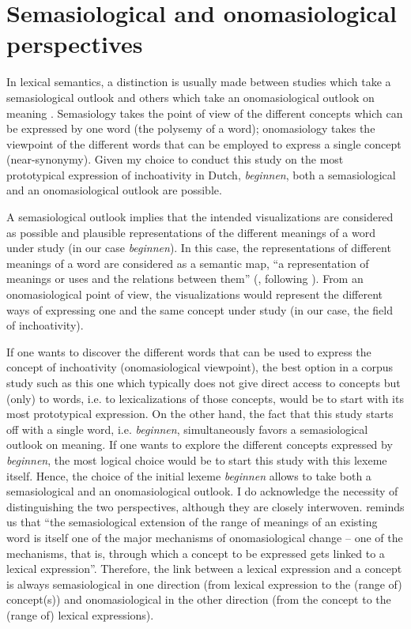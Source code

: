 \section{Semasiological and onomasiological perspectives}\largerpage
\label{sec:3.2}  
In lexical semantics, a distinction is usually made between studies which take a semasiological outlook and others which take an onomasiological outlook on meaning \citep{geeraerts_structure_1994}. Semasiology takes the point of view of the different concepts which can be expressed by one word (the polysemy of a word); onomasiology takes the viewpoint of the different words that can be employed to express a single concept (near-synonymy). Given my choice to conduct this study on the most prototypical expression of inchoativity in Dutch, \textit{beginnen}, both a semasiological and an onomasiological outlook are possible.

A semasiological outlook implies that the intended visualizations are considered as possible and plausible representations of the different meanings of a word under study (in our case \textit{beginnen}). In this case, the representations of different meanings of a word are considered as a semantic map, “a representation of meanings or uses and the relations between them” (\citealt[23]{simon-vandenbergen_semantic_2007}, following \citealt{AusweraPlungian1998}). From an onomasiological point of view, the visualizations would represent the different ways of expressing one and the same concept under study (in our case, the field of inchoativity).

If one wants to discover the different words that can be used to express the concept of inchoativity (onomasiological viewpoint), the best option in a corpus study such as this one which typically does not give direct access to concepts but (only) to words, i.e. to lexicalizations of those concepts, would be to start with its most prototypical expression. On the other hand, the fact that this study starts off with a single word, i.e. \textit{beginnen}, simultaneously favors a semasiological outlook on meaning. If one wants to explore the different concepts expressed by \textit{beginnen}, the most logical choice would be to start this study with this lexeme itself. Hence, the choice of the initial lexeme \textit{beginnen} allows to take both a semasiological and an onomasiological outlook. I do acknowledge the necessity of distinguishing the two perspectives, although they are closely interwoven. \citet[30]{geeraerts_theories_2010} reminds us that “the semasiological extension of the range of meanings of an existing word is itself one of the major mechanisms of onomasiological change – one of the mechanisms, that is, through which a concept to be expressed gets linked to a lexical expression”. Therefore, the link between a lexical expression and a concept is always semasiological in one direction (from lexical expression to the (range of) concept(s)) and onomasiological in the other direction (from the concept to the (range of) lexical expressions).\largerpage

